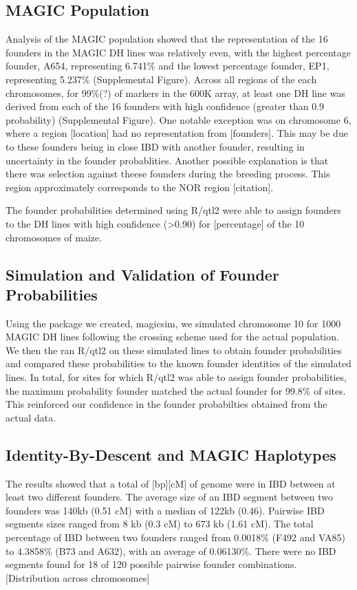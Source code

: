 \documentclass[article,9pt,twocolumn,twoside]{rilabRxiv}
\begin{document}
\subsection{MAGIC Population}
Analysis of the MAGIC population showed that the representation of the 16 founders in the MAGIC DH lines was relatively even, with the highest percentage founder, A654, representing 6.741\% and the lowest percentage founder, EP1, representing 5.237\% (Supplemental Figure). Across all regions of the each chromosomes, for 99\%(?) of markers in the 600K array, at least one DH line was derived from each of the 16 founders with high confidence (greater than 0.9 probability) (Supplemental Figure). One notable exception was on chromosome 6, where a region [location] had no representation from [founders]. This may be due to these founders being in close IBD with another founder, resulting in uncertainty in the founder probablities. Another possible explanation is that there was selection against theese founders during the breeding process. This region approximately corresponds to the NOR region [citation].


The founder probabilities determined using R/qtl2 were able to assign founders to the DH lines with high confidence (>0.90) for [percentage] of the 10 chromosomes of maize.

\subsection{Simulation and Validation of Founder Probabilities}
Using the package we created, magicsim, we simulated chromosome 10 for 1000 MAGIC DH lines following the crossing scheme used for the actual population. We then the ran R/qtl2 on these simulated lines to obtain founder probabilities and compared these probabilities to the known founder identities of the simulated lines. In total, for sites for which R/qtl2 was able to assign founder probabilities, the maximum probability founder matched the actual founder for 99.8\% of sites. This reinforced our confidence in the founder probabilties obtained from the actual data.

\subsection{Identity-By-Descent and MAGIC Haplotypes}
The results showed that a total of [bp][cM] of genome were in IBD between at
least two different founders. The average size of an IBD segment between two founders was 140kb (0.51 cM) with a median of 122kb (0.46). Pairwise IBD segments sizes ranged from 8 kb (0.3 cM) to  673 kb (1.61 cM). The total percentage of IBD between two founders ranged from 0.0018\% (F492 and VA85) to 4.3858\% (B73 and A632), with an average of 0.06130\%. There were no IBD segments found for 18 of 120 possible pairwise founder combinations.  [Distribution across chromosomes]
\end{document}
